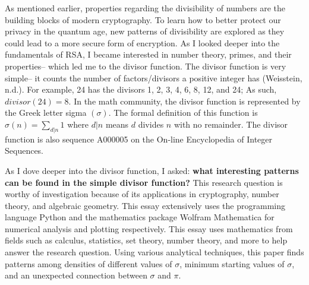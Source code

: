 \documentclass[12pt]{article}
\begin{document}
		As mentioned earlier, properties regarding the divisibility of numbers are the building blocks of modern cryptography. To learn how to better protect our privacy in the quantum age, new patterns of divisibility are explored as they could lead to a more secure form of encryption. As I looked deeper into the fundamentals of RSA, I became interested in number theory, primes, and their properties-- which led me to the divisor function. The divisor function is very simple-- it counts the number of factors/divisors a positive integer has (Weisstein, n.d.). For example, 24 has the divisors 1, 2, 3, 4, 6, 8, 12, and 24; As such, $divisor(24)=8$. In the math community, the divisor function is represented by the Greek letter sigma $(\sigma)$. The formal definition of this function is $\displaystyle\sigma(n)=\sum_{d|n}1$ where $d|n$ means $d$ divides $n$ with no remainder. The divisor function is also sequence A000005 on the On-line Encyclopedia of Integer Sequences.
		
		As I dove deeper into the divisor function, I asked: \textbf{what interesting patterns can be found in the simple divisor function?} This research question is worthy of investigation because 
		of its applications in cryptography, number theory, and algebraic geometry.
		This essay extensively uses the programming language Python and the mathematics package Wolfram Mathematica for numerical analysis and plotting respectively. This essay uses mathematics from fields such as calculus, statistics, set theory, number theory, and more to help answer the research question. Using various analytical techniques, this paper finds patterns among densities of different values of $\sigma$, minimum starting values of $\sigma$, and an unexpected connection between $\sigma$ and $\pi$.
\newpage
\end{document}
